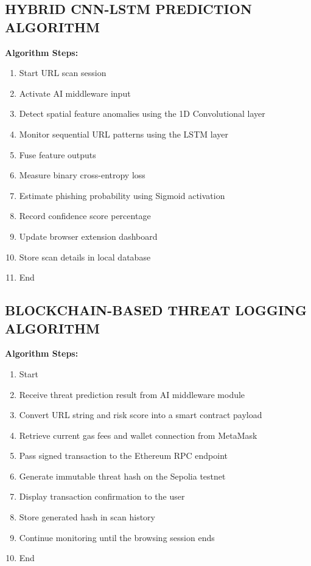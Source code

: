 \subsection{HYBRID CNN-LSTM PREDICTION ALGORITHM}
\textbf{Algorithm Steps:}
\begin{enumerate}
    \item Start URL scan session
    \item Activate AI middleware input
    \item Detect spatial feature anomalies using the 1D Convolutional layer
    \item Monitor sequential URL patterns using the LSTM layer
    \item Fuse feature outputs
    \item Measure binary cross-entropy loss
    \item Estimate phishing probability using Sigmoid activation
    \item Record confidence score percentage
    \item Update browser extension dashboard
    \item Store scan details in local database
    \item End
\end{enumerate}

\subsection{BLOCKCHAIN-BASED THREAT LOGGING ALGORITHM}
\textbf{Algorithm Steps:}
\begin{enumerate}
    \item Start
    \item Receive threat prediction result from AI middleware module
    \item Convert URL string and risk score into a smart contract payload
    \item Retrieve current gas fees and wallet connection from MetaMask
    \item Pass signed transaction to the Ethereum RPC endpoint
    \item Generate immutable threat hash on the Sepolia testnet
    \item Display transaction confirmation to the user
    \item Store generated hash in scan history
    \item Continue monitoring until the browsing session ends
    \item End
\end{enumerate}

